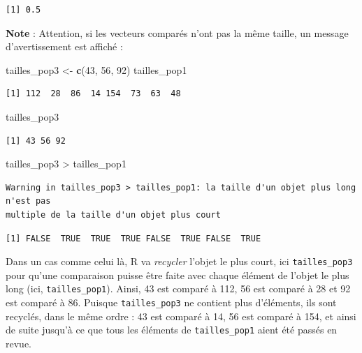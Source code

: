 \documentclass[a4paperpaper,]{article}
\newenvironment{Shaded}{\begin{snugshade}}{\end{snugshade}}
\newcommand{\DecValTok}[1]{\textcolor[rgb]{0.69,0.50,0.00}{#1}}
\newcommand{\KeywordTok}[1]{\textcolor[rgb]{0.12,0.11,0.11}{\textbf{#1}}}
\newcommand{\NormalTok}[1]{\textcolor[rgb]{0.12,0.11,0.11}{#1}}
\newcommand{\OperatorTok}[1]{\textcolor[rgb]{0.12,0.11,0.11}{#1}}
\newcommand{\StringTok}[1]{\textcolor[rgb]{0.75,0.01,0.01}{#1}}
\theoremstyle{definition}
\theoremstyle{definition}
\theoremstyle{definition}
\theoremstyle{remark}
\begin{document}
\begin{verbatim}
[1] 0.5
\end{verbatim}

\textbf{Note} : Attention, si les vecteurs comparés n'ont pas la même
taille, un message d'avertissement est affiché :

\begin{Shaded}
\begin{Highlighting}[]
\NormalTok{tailles_pop3 <-}\StringTok{ }\KeywordTok{c}\NormalTok{(}\DecValTok{43}\NormalTok{, }\DecValTok{56}\NormalTok{, }\DecValTok{92}\NormalTok{)}
\NormalTok{tailles_pop1}
\end{Highlighting}
\end{Shaded}

\begin{verbatim}
[1] 112  28  86  14 154  73  63  48
\end{verbatim}

\begin{Shaded}
\begin{Highlighting}[]
\NormalTok{tailles_pop3}
\end{Highlighting}
\end{Shaded}

\begin{verbatim}
[1] 43 56 92
\end{verbatim}

\begin{Shaded}
\begin{Highlighting}[]
\NormalTok{tailles_pop3 }\OperatorTok{>}\StringTok{ }\NormalTok{tailles_pop1}
\end{Highlighting}
\end{Shaded}

\begin{verbatim}
Warning in tailles_pop3 > tailles_pop1: la taille d'un objet plus long n'est pas
multiple de la taille d'un objet plus court
\end{verbatim}

\begin{verbatim}
[1] FALSE  TRUE  TRUE  TRUE FALSE  TRUE FALSE  TRUE
\end{verbatim}

Dans un cas comme celui là, R va \emph{recycler} l'objet le plus court,
ici \texttt{tailles\_pop3} pour qu'une comparaison puisse être faite
avec chaque élément de l'objet le plus long (ici,
\texttt{tailles\_pop1}). Ainsi, 43 est comparé à 112, 56 est comparé à
28 et 92 est comparé à 86. Puisque \texttt{tailles\_pop3} ne contient
plus d'éléments, ils sont recyclés, dans le même ordre : 43 est comparé
à 14, 56 est comparé à 154, et ainsi de suite jusqu'à ce que tous les
éléments de \texttt{tailles\_pop1} aient été passés en revue.
\end{document}

